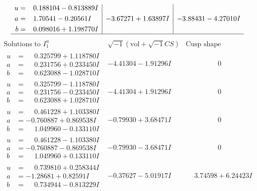 \documentclass[1p]{elsarticle_modified}
\theoremstyle{definition}
\newcommand{\I}{\sqrt{-1}}
\begin{document}
$$\begin{array}{c|c|c}
\begin{aligned}
u &= \phantom{-}0.188104 - 0.813889 I \\
a &= \phantom{-}1.70541 - 0.20561 I \\
b &= \phantom{-}0.098016 + 1.198770 I\end{aligned}
 & -3.67271 + 1.63897 I & -3.88431 - 4.27010 I\\
 \hline 
 \end{array}$$\newpage$$\begin{array}{c|c|c}  
\text{Solutions to }I^u_{1}& \I (\text{vol} + \sqrt{-1}CS) & \text{Cusp shape}\\
 \hline 
\begin{aligned}
u &= \phantom{-}0.325799 + 1.118780 I \\
a &= \phantom{-}0.231756 + 0.233450 I \\
b &= \phantom{-}0.623088 - 1.028710 I\end{aligned}
 & -4.41304 - 1.91296 I & \phantom{-0.000000 } 0 \\ \hline\begin{aligned}
u &= \phantom{-}0.325799 - 1.118780 I \\
a &= \phantom{-}0.231756 - 0.233450 I \\
b &= \phantom{-}0.623088 + 1.028710 I\end{aligned}
 & -4.41304 + 1.91296 I & \phantom{-0.000000 } 0 \\ \hline\begin{aligned}
u &= \phantom{-}0.461228 + 1.103380 I \\
a &= -0.760887 + 0.869538 I \\
b &= \phantom{-}1.049960 - 0.133110 I\end{aligned}
 & -0.79930 + 3.68471 I & \phantom{-0.000000 } 0 \\ \hline\begin{aligned}
u &= \phantom{-}0.461228 - 1.103380 I \\
a &= -0.760887 - 0.869538 I \\
b &= \phantom{-}1.049960 + 0.133110 I\end{aligned}
 & -0.79930 - 3.68471 I & \phantom{-0.000000 } 0 \\ \hline\begin{aligned}
u &= \phantom{-}0.739810 + 0.258344 I \\
a &= -1.28681 + 0.82591 I \\
b &= \phantom{-}0.734944 - 0.813229 I\end{aligned}
 & -0.37627 - 5.01917 I & \phantom{-}3.74598 + 6.24423 I \\ \hline\begin{aligned}

\end{aligned}
\end{array}$$
\end{document}

